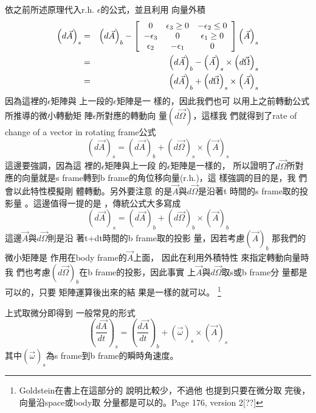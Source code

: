 \documentclass[12pt,a4paper]{article}
\begin{document}
依之前所述原理代入r.h. 
$\epsilon $的公式，並且利用%
向量外積%
\begin{eqnarray*}
\left( d\vec{A}\right) _{s} &=&\left( d\vec{A}\right) _{b}-\left[ 
\begin{array}{ccc}
0 & \epsilon _{3}\geq 0 & -\epsilon _{2}\leq 0 \\ 
-\epsilon _{3} & 0 & \epsilon _{1}\geq 0 \\ 
\epsilon _{2} & -\epsilon _{1} & 0%
\end{array}%
\right] \left( \vec{A}\right) _{s} \\
&=&\left( d\vec{A}\right) _{b}-\left( \vec{A}\right) _{s}\times \left( d\vec{%
\Omega}\right) _{s} \\
&=&\left( d\vec{A}\right) _{b}+\left( d\vec{\Omega}\right) _{s}\times \left( 
\vec{A}\right) _{s}
\end{eqnarray*}%
因為這裡的$\epsilon $矩陣與%
上一段的$\epsilon $矩陣是一%
樣的，因此我們也可%
以用上之前轉動公式%
所推導的微小轉動矩%
陣$\epsilon $所對應的轉動向%
量$\left( d\vec{\Omega}\right) $，這樣我%
們就得到了rate of change of a vector in
rotating frame公式%
\begin{equation}
\left( d\vec{A}\right) _{s}=\left( d\vec{A}\right) _{b}+\left( d\vec{\Omega}%
\right) _{s}\times \left( \vec{A}\right) _{s}  \label{rateofdomega}
\end{equation}%
這邊要強調，因為這%
裡的$\epsilon $矩陣與上一段%
的$\epsilon $矩陣是一樣的，%
所以證明了$d\vec{\Omega}$所對%
應的向量就是s frame轉到b
frame的角位移向量(r.h.)，這%
樣強調的目的是，我%
們會以此特性模擬剛%
體轉動。另外要注意%
的是$\vec{A}$與$d\vec{\Omega}$是沿著t%
時間的s frame取的投影量%
。這邊值得一提的是%
，傳統公式大多寫成%
\begin{equation*}
\left( d\vec{A}\right) _{s}=\left( d\vec{A}\right) _{b}+\left( d\vec{\Omega}%
\right) _{b}\times \left( \vec{A}\right) _{b}
\end{equation*}%
這邊$\vec{A}$與$d\vec{\Omega}$則是沿%
著t+dt時間的b frame取的投影%
量，因若考慮$\left( \vec{A}\right) _{b}$%
那我們的微小矩陣是%
作用在body frame的$\vec{A}$上面，%
因此在利用外積特性%
來指定轉動向量時我%
們也考慮$\left( d\vec{\Omega}\right) _{b}$在b
frame的投影$， $因此事實%
上$\vec{A}$與$d\vec{\Omega}$取s或b frame分%
量都是可以的，只要%
矩陣運算後出來的結%
果是一樣的就可以。%
\footnote{%
Goldstein在書上在這部分的%
說明比較少，不過他%
也提到只要在微分取%
完後，向量沿space或body取%
分量都是可以的。Page 176,
version 2[??]}

\bigskip 上式取微分即得到%
一般常見的形式%
\begin{equation}
\left( \frac{d\vec{A}}{dt}\right) _{s}=\left( \frac{d\vec{A}}{dt}\right)
_{b}+\left( \vec{\omega}\right) _{s}\times \left( \vec{A}\right) _{s}
\label{rateofchange}
\end{equation}%
其中$\left( \vec{\omega}\right) _{s}$為s frame到b
frame的瞬時角速度。
\end{document}
